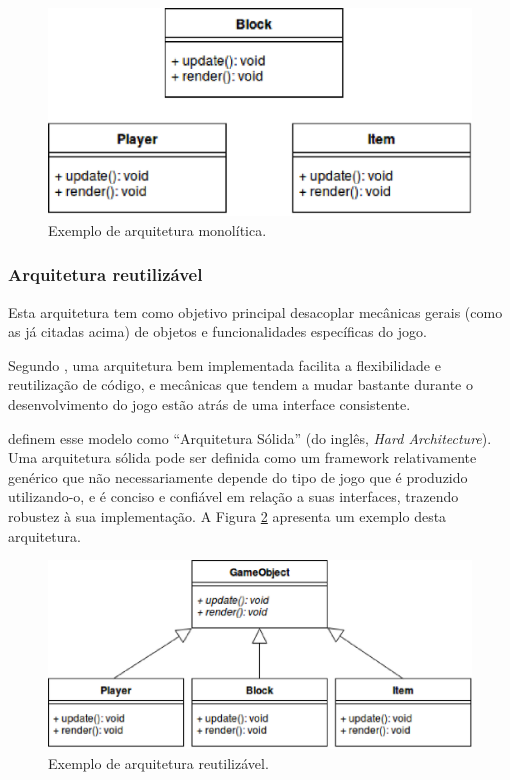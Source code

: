 \begin{figure}[H]
 \centering \includegraphics[keepaspectratio=true,scale=0.6]{figuras/monolithic-architecture.eps}
   \caption[Exemplo de arquitetura monolítica]
    {Exemplo de arquitetura monolítica.}
   \label{arch-monolitica}
\end{figure}

\subsubsection{Arquitetura reutilizável}

Esta arquitetura tem como objetivo principal desacoplar mecânicas gerais (como as já citadas acima) de objetos e funcionalidades específicas do jogo.

Segundo , uma arquitetura bem implementada facilita a flexibilidade e reutilização de código, e mecânicas que tendem a mudar bastante durante o desenvolvimento do jogo estão atrás de uma interface consistente.

 definem esse modelo como “Arquitetura Sólida” (do inglês, \textit{Hard Architecture}). Uma arquitetura sólida pode ser definida como um framework relativamente genérico que não necessariamente depende do tipo de jogo que é produzido utilizando-o, e é conciso e confiável em relação a suas interfaces, trazendo robustez à sua implementação. A Figura \ref{arch-reutilizavel} apresenta um exemplo desta arquitetura.

\begin{figure}[H]
 \centering \includegraphics[keepaspectratio=true,scale=0.6]{figuras/reusable-architecture.eps}
   \caption[Exemplo de arquitetura reutilizável]
    {Exemplo de arquitetura reutilizável.}
   \label{arch-reutilizavel}
\end{figure}

